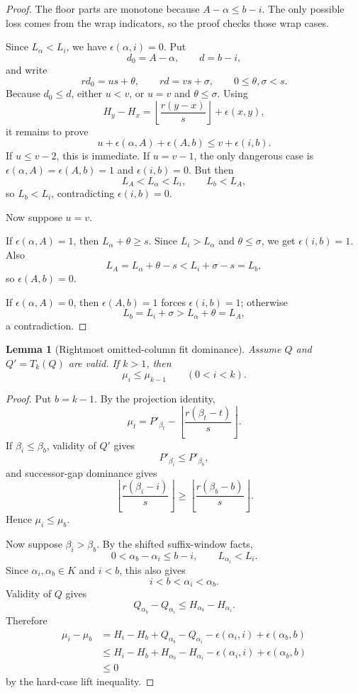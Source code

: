 \documentclass[10pt]{article}
\newtheorem{lemma}{Lemma}
\begin{document}
\begin{proof}
The floor parts are monotone because \(A-\alpha\le b-i\).  The only possible
loss comes from the wrap indicators, so the proof checks those wrap cases.

Since \(L_\alpha<L_i\), we have \(\epsilon(\alpha,i)=0\).  Put
\[
  d_0=A-\alpha,\qquad d=b-i,
\]
and write
\[
  rd_0=us+\theta,\qquad rd=vs+\sigma,\qquad 0\le\theta,\sigma<s.
\]
Because \(d_0\le d\), either \(u<v\), or \(u=v\) and \(\theta\le\sigma\).
Using
\[
  H_y-H_x=\left\lfloor\frac{r(y-x)}s\right\rfloor+\epsilon(x,y),
\]
it remains to prove
\[
  u+\epsilon(\alpha,A)+\epsilon(A,b)\le v+\epsilon(i,b).
\]
If \(u\le v-2\), this is immediate.  If \(u=v-1\), the only dangerous case is
\(\epsilon(\alpha,A)=\epsilon(A,b)=1\) and \(\epsilon(i,b)=0\).  But then
\[
  L_A<L_\alpha<L_i,\qquad L_b<L_A,
\]
so \(L_b<L_i\), contradicting \(\epsilon(i,b)=0\).

Now suppose \(u=v\).

If \(\epsilon(\alpha,A)=1\), then \(L_\alpha+\theta\ge s\).  Since
\(L_i>L_\alpha\) and \(\theta\le\sigma\), we get \(\epsilon(i,b)=1\).  Also
\[
  L_A=L_\alpha+\theta-s<L_i+\sigma-s=L_b,
\]
so \(\epsilon(A,b)=0\).

If \(\epsilon(\alpha,A)=0\), then \(\epsilon(A,b)=1\) forces
\(\epsilon(i,b)=1\); otherwise
\[
  L_b=L_i+\sigma>L_\alpha+\theta=L_A,
\]
a contradiction.
\end{proof}

\begin{lemma}[Rightmost omitted-column fit dominance]
Assume \(Q\) and \(Q'=T_k(Q)\) are valid.  If \(k>1\), then
\[
  \mu_i\le \mu_{k-1}\qquad(0<i<k).
\]
\end{lemma}

\begin{proof}
Put \(b=k-1\).  By the projection identity,
\[
  \mu_t
  =
  P'_{\beta_t}
  -
  \left\lfloor\frac{r(\beta_t-t)}s\right\rfloor .
\]
If \(\beta_i\le\beta_b\), validity of \(Q'\) gives
\[
  P'_{\beta_i}\le P'_{\beta_b},
\]
and successor-gap dominance gives
\[
  \left\lfloor\frac{r(\beta_i-i)}s\right\rfloor
  \ge
  \left\lfloor\frac{r(\beta_b-b)}s\right\rfloor .
\]
Hence \(\mu_i\le\mu_b\).

Now suppose \(\beta_i>\beta_b\).  By the shifted suffix-window facts,
\[
  0<\alpha_b-\alpha_i\le b-i,\qquad
  L_{\alpha_i}<L_i.
\]
Since \(\alpha_i,\alpha_b\in K\) and \(i<b\), this also gives
\[
  i<b<\alpha_i<\alpha_b.
\]
Validity of \(Q\) gives
\[
  Q_{\alpha_b}-Q_{\alpha_i}\le H_{\alpha_b}-H_{\alpha_i}.
\]
Therefore
\[
  \begin{aligned}
  \mu_i-\mu_b
  &=H_i-H_b+Q_{\alpha_b}-Q_{\alpha_i}
    -\epsilon(\alpha_i,i)+\epsilon(\alpha_b,b)\\
  &\le H_i-H_b+H_{\alpha_b}-H_{\alpha_i}
    -\epsilon(\alpha_i,i)+\epsilon(\alpha_b,b)\\
  &\le0
  \end{aligned}
\]
by the hard-case lift inequality.
\end{proof}
\end{document}
